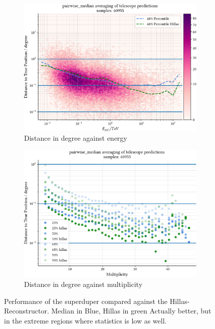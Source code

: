 \begin{figure}
    \centering
    \begin{subfigure}{0.45\textwidth}
        \includegraphics[width=0.9\linewidth]{../analysis/plots/gamma/pairwise_median_100_vs_energy.pdf} 
        \caption{Distance in degree against energy}
    \end{subfigure}
    \begin{subfigure}{0.45\textwidth}
        \includegraphics[width=0.9\linewidth]{../analysis/plots/gamma/pairwise_median_100_vs_multi_comp.pdf}
        \caption{Distance in degree against multiplicity}
    \end{subfigure}
    \caption{Performance of the superduper compared 
    against the Hillas-Reconstructor. Median in Blue, Hillas in green
    Actually better, but in the extreme regions where statistics is low as well.}
    \label{fig:stereo_double_magic}
\end{figure}


